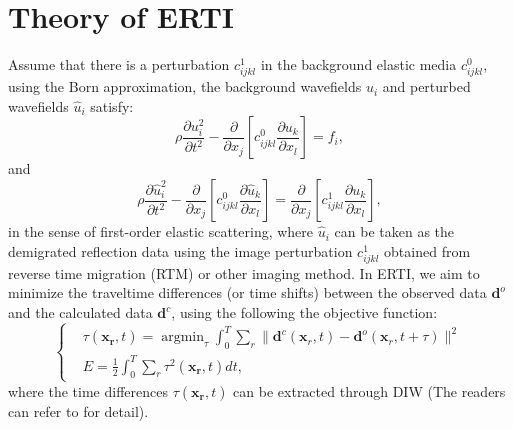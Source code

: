 \section{Theory of ERTI}
Assume that there is a perturbation $c^{1}_{ijkl}$ in the background elastic media
$c^0_{ijkl}$, using the Born approximation, the background wavefields $u_i$ and perturbed wavefields
$\hat{u}_i$ satisfy:
\begin{equation}
    \rho \frac{\partial u^2_i}{\partial t^2}  -
    \frac{\partial}{\partial x_j}\left[ 
        c^0_{ijkl}\frac{\partial u_{k}}{\partial
        x_l}\right]=f_i,
    \label{eq:WE} 
\end{equation}
and
\begin{equation}
	\rho \frac{\partial \hat{u}^2_i}{\partial t^2}  -
    \frac{\partial}{\partial x_j}\left[ 
	c^0_{ijkl}\frac{\partial \hat{u}_{k}}{\partial
        x_l}\right]=\frac{\partial}{\partial x_j}\left[c^1_{ijkl}\frac{\partial u_{k}}{\partial x_l}\right],
    \label{eq:DeltaWE} 
\end{equation}
in the sense of first-order elastic scattering, where $\hat{u}_i$ can be taken as the demigrated reflection data using the image
perturbation $c^1_{ijkl}$ obtained from reverse time migration (RTM) or other imaging method. In ERTI, we
aim to minimize the traveltime differences (or time shifts) between the observed data
$\mathbf{d}^{o}$ and
the calculated data $\mathbf{d}^{c}$, using the following  
the objective function: 
\begin{equation}
	\left\{
		\begin{aligned}
			&\tau(\mathbf{x_r},t)=\mathop{\arg\min}_{\tau}
			\int^T_0\sum_r\parallel\mathbf{d}^{c}(\mathbf{x}_r,t)-\mathbf{d}^{o}(\mathbf{x}_r,t+\tau)\parallel^2\\
    &E=\frac{1}{2}\int^T_0\sum_r\tau^2(\mathbf{x_r},t)dt,
		\end{aligned}
	\right.
    \label{eq:Objectivefunction} 
\end{equation}
where the time differences $\tau(\mathbf{x_r},t)$ can be extracted
through DIW (The readers can refer to \cite{Hale2013} for detail).

